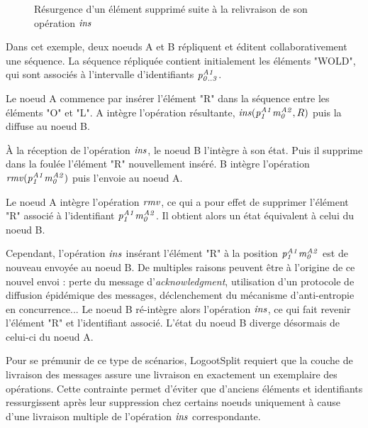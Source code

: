 \begin{figure}[!ht]
{
  }
  \caption{Résurgence d'un élément supprimé suite à la relivraison de son opération $\mathit{ins}$}
  \label{fig:why-exactly-once-delivery}
\end{figure}

Dans cet exemple, deux noeuds A et B répliquent et éditent collaborativement une séquence.
La séquence répliquée contient initialement les éléments "WOLD", qui sont associés à l'intervalle d'identifiants $\mathit{p}^{\mathit{A1}}_{\mathit{0..3}}$.

Le noeud A commence par insérer l'élément "R" dans la séquence entre les éléments "O" et "L".
A intègre l'opération résultante, $\mathit{ins}(\mathit{p}^{\mathit{A1}}_{\mathit{1}}\mathit{m}^{\mathit{A2}}_{\mathit{0}},R)$ puis la diffuse au noeud B.

À la réception de l'opération $\mathit{ins}$, le noeud B l'intègre à son état.
Puis il supprime dans la foulée l'élément "R" nouvellement inséré.
B intègre l'opération $\mathit{rmv}(\mathit{p}^{\mathit{A1}}_{\mathit{1}}\mathit{m}^{\mathit{A2}}_{\mathit{0}})$ puis l'envoie au noeud A.

Le noeud A intègre l'opération $\mathit{rmv}$, ce qui a pour effet de supprimer l'élément "R" associé à l'identifiant $\mathit{p}^{\mathit{A1}}_{\mathit{1}}\mathit{m}^{\mathit{A2}}_{\mathit{0}}$.
Il obtient alors un état équivalent à celui du noeud B.

Cependant, l'opération $\mathit{ins}$ insérant l'élément "R" à la position $\mathit{p}^{\mathit{A1}}_{\mathit{1}}\mathit{m}^{\mathit{A2}}_{\mathit{0}}$ est de nouveau envoyée au noeud B.
De multiples raisons peuvent être à l'origine de ce nouvel envoi : perte du message d'\emph{acknowledgment}, utilisation d'un protocole de diffusion épidémique des messages, déclenchement du mécanisme d'anti-entropie en concurrence...
Le noeud B ré-intègre alors l'opération $\mathit{ins}$, ce qui fait revenir l'élément "R" et l'identifiant associé.
L'état du noeud B diverge désormais de celui-ci du noeud A.

Pour se prémunir de ce type de scénarios, LogootSplit requiert que la couche de livraison des messages assure une livraison en exactement un exemplaire des opérations.
Cette contrainte permet d'éviter que d'anciens éléments et identifiants ressurgissent après leur suppression chez certains noeuds uniquement à cause d'une livraison multiple de l'opération $\mathit{ins}$ correspondante.
